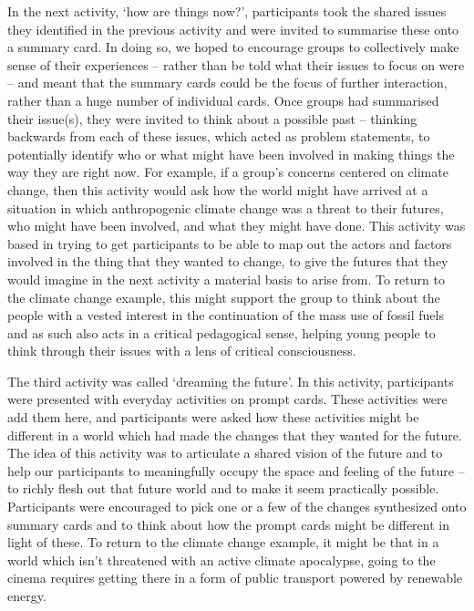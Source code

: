In the next activity, ‘how are things now?’, participants took the shared issues they identified in the previous activity and were invited to summarise these onto a summary card. In doing so, we hoped to encourage groups to collectively make sense of their experiences – rather than be told what their issues to focus on were – and meant that the summary cards could be the focus of further interaction, rather than a huge number of individual cards. Once groups had summarised their issue(s), they were invited to think about a possible past – thinking backwards from each of these issues, which acted as problem statements, to potentially identify who or what might have been involved in making things the way they are right now. For example, if a group’s concerns centered on climate change, then this activity would ask how the world might have arrived at a situation in which anthropogenic climate change was a threat to their futures, who might have been involved, and what they might have done. This activity was based in trying to get participants to be able to map out the actors and factors involved in the thing that they wanted to change, to give the futures that they would imagine in the next activity a material basis to arise from. To return to the climate change example, this might support the group to think about the people with a vested interest in the continuation of the mass use of fossil fuels and as such also acts in a critical pedagogical sense, helping young people to think through their issues with a lens of critical consciousness. 

The third activity was called ‘dreaming the future’. In this activity, participants were presented with everyday activities on prompt cards. These activities were add them here, and participants were asked how these activities might be different in a world which had made the changes that they wanted for the future. The idea of this activity was to articulate a shared vision of the future and to help our participants to meaningfully occupy the space and feeling of the future – to richly flesh out that future world and to make it seem practically possible. Participants were encouraged to pick one or a few of the changes synthesized onto summary cards and to think about how the prompt cards might be different in light of these. To return to the climate change example, it might be that in a world which isn’t threatened with an active climate apocalypse, going to the cinema requires getting there in a form of public transport powered by renewable energy. 

